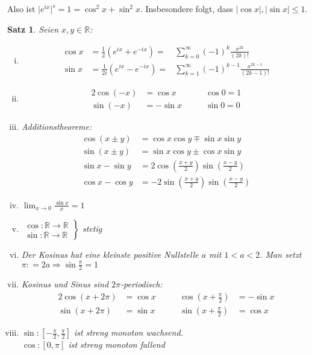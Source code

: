 \documentclass[ngerman,titlepage,twoside, parskip=half*]{scrreprt}
\newcommand*{\R}{\mathbb{R}}
\theoremstyle{plain}
\newtheorem{theorem}{Satz}[section]
\theoremstyle{definition}
\theoremstyle{remark}
\newcommand*{\abs}[2][]{#1\lvert#2#1\rvert}
\newcommand*{\coloneqq}{\mathrel{\mathop:}=}
\begin{document}
Also ist $\abs{e^{ix}}^s=1=\cos^2 x+\sin^2 x$. Insbesondere folgt, dass $\abs{\cos x}, \abs{\sin x}\leq 1$.

\begin{theorem}
Seien $x,y\in\R$:
\begin{enumerate}[(i)]
  \item \begin{align*}
    \cos x & = \frac{1}{2}(e^{ix}+e^{-ix}) =  &\sum_{k=0}^\infty (-1)^k \frac{x^{2k}}{(2k)!}\\
    \sin x & = \frac{1}{2i}(e^{ix}-e^{-ix}) =  &\sum_{k=1}^\infty (-1)^{k-1}\frac{x^{2k-1}}{(2k-1)!}
  \end{align*}
  \item \begin{alignat*}{2}
    \cos (-x) & = \cos x & \qquad \cos 0 = 1\\
    \sin (-x) & = -\sin x & \qquad \sin 0 =0
  \end{alignat*}
  \item Additionstheoreme:
  \begin{align*}
    \cos (x\pm y) & = \cos x \cos y \mp \sin x \sin y\\
    \sin (x\pm y) & = \sin x \cos y \pm \cos x \sin y\\
    \sin x - \sin y & = 2\cos (\frac{x+y}{2})\sin (\frac{x-y}{2})\\
    \cos x - \cos y & = -2\sin (\frac{x+y}{2})\sin(\frac{x-y}{2})
  \end{align*}
  \item $\lim_{x\rightarrow 0} \frac{\sin x}{x}=1$
  \item $\left.\begin{array}{rcl}
    \cos \colon\R\rightarrow\R\\
    \sin \colon \R\rightarrow\R\end{array}\right\}$ stetig
  \item Der Kosinus hat eine kleinste positive Nullstelle $a$ mit $1<a<2$. Man setzt $\pi\coloneqq2a\Rightarrow
    \sin \frac{\pi}{2}=1$
  \item Kosinus und Sinus sind $2\pi$-periodisch:
    \begin{alignat*}{2}
      \cos (x+2\pi) & = \cos x & \qquad \cos (x+\frac{\pi}{2}) & = -\sin x\\
      \sin (x+2\pi) & = \sin x & \qquad \sin (x+\frac{\pi}{2}) & = \cos x
    \end{alignat*}
  \item $\sin \colon [-\frac{\pi}{2},\frac{\pi}{2}]$ ist streng monoton wachsend.\\
    $\cos \colon [0,\pi]$ ist streng monoton fallend
\end{enumerate}
\end{theorem}
\end{document}

